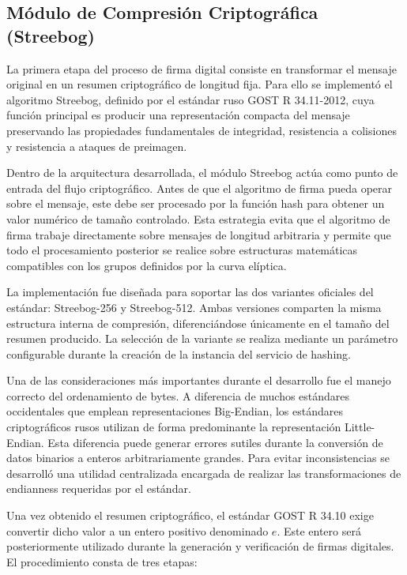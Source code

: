 \subsection{Módulo de Compresión Criptográfica (Streebog)}

La primera etapa del proceso de firma digital consiste en transformar el mensaje original en un resumen criptográfico de longitud fija. Para ello se implementó el algoritmo Streebog, definido por el estándar ruso GOST R 34.11-2012, cuya función principal es producir una representación compacta del mensaje preservando las propiedades fundamentales de integridad, resistencia a colisiones y resistencia a ataques de preimagen.

Dentro de la arquitectura desarrollada, el módulo Streebog actúa como punto de entrada del flujo criptográfico. Antes de que el algoritmo de firma pueda operar sobre el mensaje, este debe ser procesado por la función hash para obtener un valor numérico de tamaño controlado. Esta estrategia evita que el algoritmo de firma trabaje directamente sobre mensajes de longitud arbitraria y permite que todo el procesamiento posterior se realice sobre estructuras matemáticas compatibles con los grupos definidos por la curva elíptica.

La implementación fue diseñada para soportar las dos variantes oficiales del estándar: Streebog-256 y Streebog-512. Ambas versiones comparten la misma estructura interna de compresión, diferenciándose únicamente en el tamaño del resumen producido. La selección de la variante se realiza mediante un parámetro configurable durante la creación de la instancia del servicio de hashing.

Una de las consideraciones más importantes durante el desarrollo fue el manejo correcto del ordenamiento de bytes. A diferencia de muchos estándares occidentales que emplean representaciones Big-Endian, los estándares criptográficos rusos utilizan de forma predominante la representación Little-Endian. Esta diferencia puede generar errores sutiles durante la conversión de datos binarios a enteros arbitrariamente grandes. Para evitar inconsistencias se desarrolló una utilidad centralizada encargada de realizar las transformaciones de endianness requeridas por el estándar.

Una vez obtenido el resumen criptográfico, el estándar GOST R 34.10 exige convertir dicho valor a un entero positivo denominado $e$. Este entero será posteriormente utilizado durante la generación y verificación de firmas digitales. El procedimiento consta de tres etapas:

